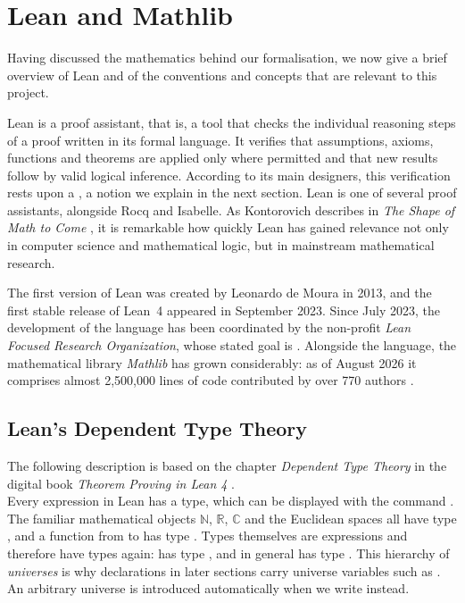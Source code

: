 \documentclass[11pt, a4paper, english]{article}
\theoremstyle{plain}
\theoremstyle{definition}
\theoremstyle{remark}
\numberwithin{equation}{section}
\numberwithin{theorem}{section}
\begin{document}
\clearpage 
\section {Lean and Mathlib} \label{section:Lean}

Having discussed the mathematics behind our formalisation, we now give a brief overview of Lean and of the conventions and concepts that are relevant to this project.

Lean is a proof assistant, that is, a tool that checks the individual reasoning steps of a proof written in its formal language. It verifies that assumptions, axioms, functions and theorems are applied only where permitted and that new results follow by valid logical inference. According to its main designers, this verification rests upon a , a notion we explain in the next section. Lean is one of several proof assistants, alongside Rocq and Isabelle. As Kontorovich describes in \emph{The Shape of Math to Come} \cite{KON25}, it is remarkable how quickly Lean has gained relevance not only in computer science and mathematical logic, but in mainstream mathematical research.

The first version of Lean was created by Leonardo de Moura in 2013, and the first stable release of Lean~4 appeared in September 2023. Since July 2023, the development of the language has been coordinated by the non-profit \emph{Lean Focused Research Organization}, whose stated goal is . Alongside the language, the mathematical library \emph{Mathlib} has grown considerably: as of August 2026 it comprises almost 2,500,000 lines of code contributed by over 770 authors \cite{MStats}.

\subsection{Lean's Dependent Type Theory} \label{subsec:typetheory}
The following description is based on the chapter \emph{Dependent Type Theory} in the digital book \emph{Theorem Proving in Lean 4}  \cite{TPIL}. \\ 
Every expression in Lean has a type, which can be displayed with the command . The familiar mathematical objects $\mathbb{N}$, $\mathbb{R}$, $\mathbb{C}$ and the Euclidean spaces all have type , and a function from  to  has type . Types themselves are expressions and therefore have types again:  has type , and in general  has type . This hierarchy of \emph{universes} is why declarations in later sections carry universe variables such as . An arbitrary universe is introduced automatically when we write  instead.
\end{document}
